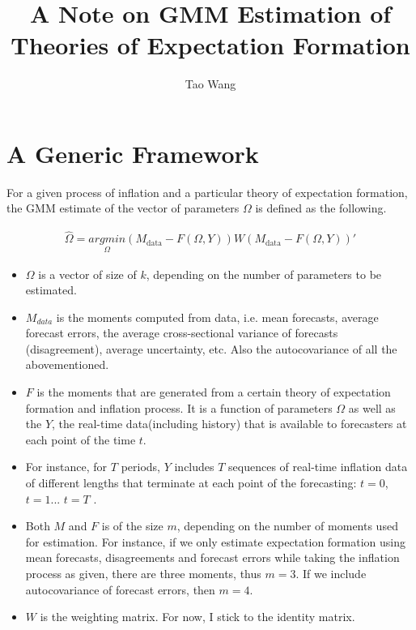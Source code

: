 \documentclass[]{article}
\title{A Note on GMM Estimation of Theories of Expectation Formation}
\author{Tao Wang}
\begin{document}
\maketitle

\section{A Generic Framework}

For a given process of inflation and a particular theory of expectation formation, the GMM estimate of the vector of parameters $\Omega$ is defined as the following. 

\begin{eqnarray}
\widehat \Omega = \underset{\Omega }{argmin} (M_{\textrm{data} } - F(\Omega, Y)) W  (M_{\textrm{data} } - F(\Omega, Y))'
\end{eqnarray}

\begin{itemize}
	\item  $\Omega$ is a vector of size of $k$, depending on the number of parameters to be estimated. 
	\item $M_{data}$ is the moments computed from data, i.e. mean forecasts, average forecast errors, the average cross-sectional variance of forecasts (disagreement), average uncertainty, etc. Also the autocovariance of all the abovementioned.  
	
	\item $F$ is the moments that are generated from a certain theory of expectation formation and inflation process. It is a function of parameters $\Omega$ as well as the $Y$, the real-time data(including history) that is available to forecasters at each point of the time $t$. 
	\item For instance, for $T$ periods, $Y$ includes $T$  sequences of real-time inflation data of different lengths that terminate at each point of the forecasting:  $t =0$, $t=1$... $t=T$ . 
	\item  Both $M$ and $F$ is of the size  $m$, depending on the number of moments used for estimation. For instance, if we only estimate expectation formation using mean forecasts, disagreements and forecast errors while taking the inflation process as given, there are three moments, thus $m = 3$. If we include autocovariance of forecast errors, then $m=4$.  
	
	\item $W$ is the weighting matrix. For now, I stick to the identity matrix. 
\end{itemize}
\end{document}
